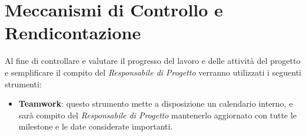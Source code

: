 \section {Meccanismi di Controllo e Rendicontazione}
Al fine di controllare e valutare il progresso del lavoro e delle
attività del progetto e semplificare il compito del \textit{Responsabile 
di Progetto} verranno utilizzati i seguenti strumenti:
\begin{itemize}
  \item \textbf{Teamwork}: questo strumento mette a disposizione
	un calendario interno, e sarà compito del \textit{Responsabile di Progetto}
	mantenerlo aggiornato con tutte le milestone e le date considerate importanti.
  
\end{itemize}
